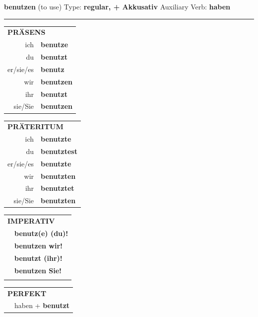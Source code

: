 \documentclass[10pt,a4paper]{revtex4-2}
\begin{document}
\begin{verbbox-acc}
    {\Large \bf benutzen} (to use) \hfill Type: \textbf{regular, + Akkusativ} \hfill Auxiliary Verb: \textbf{haben} 
    
     \vspace{5pt}

    \hrule
    
    \vspace{5pt}

  \begin{tabular}{rl}
     \multicolumn{2}{l}{\textbf{PRÄSENS} }\\
    ich & \textbf{benutze}\\
    du & \textbf{benutzt}\\
    er/sie/es & \textbf{benutz}\\
    wir & \textbf{benutzen}\\
    ihr & \textbf{benutzt}\\
    sie/Sie & \textbf{benutzen}\\
  \end{tabular}
  \hfill
     \begin{tabular}{rl}
    \multicolumn{2}{l}{\textbf{PRÄTERITUM} }\\
    ich & \textbf{benutzte}\\
    du & \textbf{benutztest}\\
    er/sie/es & \textbf{benutzte}\\
    wir & \textbf{benutzten}\\
    ihr & \textbf{benutztet}\\
    sie/Sie & \textbf{benutzten}\\
  \end{tabular}
  \hfill
  \begin{tabular}{rl}
     \multicolumn{2}{l}{\textbf{IMPERATIV} }\\
   & \textbf{benutz(e) (du)!}\\
   & \textbf{benutzen wir!}\\
   & \textbf{benutzt (ihr)!}\\
   & \textbf{benutzen Sie!}\\
   & \vspace{10pt}
  \end{tabular}

    \vspace{10pt}

 \begin{tabular}{rl}
     \multicolumn{2}{l}{\textbf{PERFEKT}}\\
   & haben + \textbf{benutzt}\\
  \end{tabular}
\hfill
   \begin{tabular}{rl}
   

\end{tabular}
\end{verbbox-acc}
\end{document}
